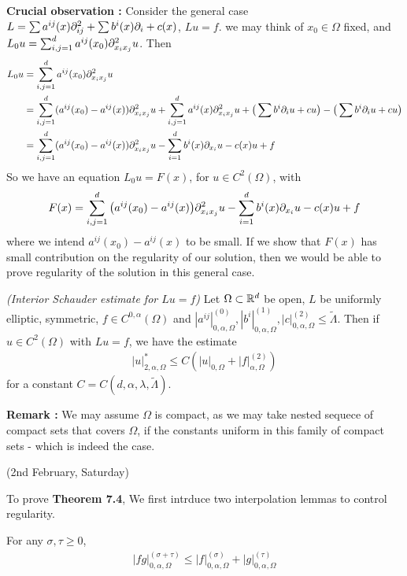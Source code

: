 \documentclass[12pt,a4paper]{article}
\begin{document}
\textbf{Crucial observation :} Consider the general case $L =\sum a^{ij}(x) \partial^2_{ij} + \sum b^i(x) \partial_i +c(x)$, $Lu =f$. we may think of $x_0\in \Omega$ fixed, and $L_0 u = \sum_{i,j=1}^d a^{ij}(x_0)  \partial_{x_i x_j}^2 u$. Then
\begin{align*}
L_0 u &= \sum_{i,j=1}^d a^{ij}(x_0) \partial_{x_i x_j}^2 u \\
&=\sum_{i,j=1}^d (a^{ij}(x_0) - a^{ij}(x))\partial^2_{x_i x_j} u + \sum_{i,j=1}^d a^{ij}(x) \partial^2_{x_i x_j} u + \big( \sum b^i\partial_i u + cu \big) - \big( \sum b^i\partial_i u + cu \big) \\
&= \sum_{i,j=1}^d (a^{ij}(x_0) - a^{ij}(x))\partial^2_{x_i x_j} u - \sum_{i=1}^d b^i(x) \partial_{x_i} u -c(x)u +f
\end{align*}
So we have an equation $L_0 u =F(x)$, for $u\in C^2(\Omega)$, with
\begin{align*}
F(x)= \sum_{i,j=1}^d \big( a^{ij}(x_0) - a^{ij}(x) \big) \partial^2_{x_i x_j}u  - \sum_{i=1}^d b^i(x) \partial_{x_i} u -c(x)u +f
\end{align*}
where we intend $a^{ij}(x_0) - a^{ij}(x)$ to be small. If we show that $F(x)$ has small contribution on the regularity of our solution, then we would be able to prove regularity of the solution in this general case.
\s

 \emph{(Interior Schauder estimate for $Lu=f$)} Let $\Omega \subset \mathbb{R}^d$ be open, $L$ be uniformly elliptic, symmetric, $f\in C^{0, \alpha}(\Omega)$ and $|a^{ij}|^{(0)}_{0, \alpha, \Omega}, |b^i|^{(1)}_{0, \alpha, \Omega}, |c|^{(2)}_{0, \alpha, \Omega} \leq \tilde{\Lambda}$. Then if $u\in C^2(\Omega)$ with $Lu =f$, we have the estimate
\begin{align*}
|u|^*_{2, \alpha, \Omega} \leq C(|u|_{0, \Omega} + |f|^{(2)}_{\alpha, \Omega})
\end{align*}
for a constant $C= C(d, \alpha, \lambda, \tilde{\Lambda})$.
\s

\textbf{Remark :} We may assume $\Omega$ is compact, as we may take nested sequece of compact sets that covers $\Omega$, if the constants uniform in this family of compact sets - which is indeed the case.
\s

\newday

(2nd February, Saturday)
\s

To prove \textbf{Theorem 7.4}, We first intrduce two interpolation lemmas to control regularity.
\s

 For any $\sigma,\tau \geq 0$,
\begin{align*}
|fg|^{(\sigma +\tau)}_{0, \alpha, \Omega}\leq |f|^{(\sigma)}_{0, \alpha, \Omega} + |g|^{(\tau)}_{0, \alpha, \Omega}
\end{align*}
\s
\end{document}

